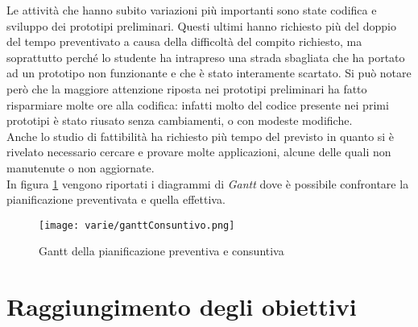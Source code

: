 Le attività che hanno subito variazioni più importanti sono state codifica e sviluppo dei prototipi preliminari. Questi ultimi hanno richiesto più del doppio del tempo preventivato a causa della difficoltà del compito richiesto, ma soprattutto perché lo studente ha intrapreso una strada sbagliata che ha portato ad un prototipo non funzionante e che è stato interamente scartato. Si può notare però che la maggiore attenzione riposta nei prototipi preliminari ha fatto risparmiare molte ore alla codifica: infatti molto del codice presente nei primi prototipi è stato riusato senza cambiamenti, o con modeste modifiche.\\
Anche lo studio di fattibilità ha richiesto più tempo del previsto in quanto si è rivelato necessario cercare e provare molte applicazioni, alcune delle quali non manutenute o non aggiornate.\\
In figura \ref{gantt:pianificaiozne} vengono riportati i diagrammi di \emph{Gantt} dove è possibile confrontare la pianificazione preventivata e quella effettiva.

\begin{figure}[H] 
    \centering 
    \texttt{[image: varie/ganttConsuntivo.png]} 
    \caption{Gantt della pianificazione preventiva e consuntiva}
    \label{gantt:pianificaiozne}
\end{figure}

\section{Raggiungimento degli obiettivi}
